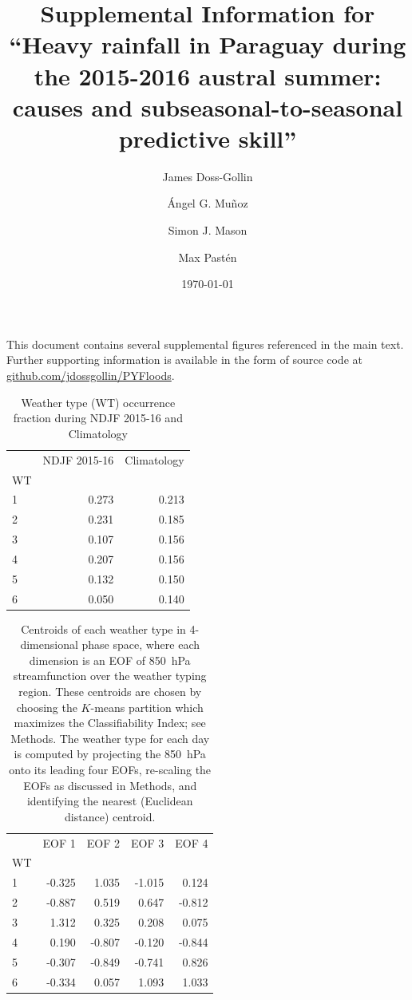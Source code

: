 \documentclass{article}
\title{Supplemental Information for\\``Heavy rainfall in Paraguay during the 2015-2016 austral summer: causes and subseasonal-to-seasonal predictive skill''}
\author{James Doss-Gollin\and \'{A}ngel G. Mu\~{n}oz  \and Simon J. Mason \and Max Past\'{e}n }
\date{\today}
\begin{document}
\maketitle

This document contains several supplemental figures referenced in the main text.
Further supporting information is available in the form of source code at \url{github.com/jdossgollin/PYFloods}.

\listoftables
\listoffigures

\clearpage

\begin{table}
	\centering
	\begin{tabular}{lrr}
		\toprule
		{} &  NDJF 2015-16 &  Climatology \\
		WT &               &              \\
		\midrule
		1     &         0.273 &        0.213 \\
		2     &         0.231 &        0.185 \\
		3     &         0.107 &        0.156 \\
		4     &         0.207 &        0.156 \\
		5     &         0.132 &        0.150 \\
		6     &         0.050 &        0.140 \\
		\bottomrule
	\end{tabular}
	\caption{Weather type (WT) occurrence fraction during NDJF 2015-16 and Climatology}
\end{table}

\begin{table}
	\centering
	\begin{tabular}{lrrrr}
		\toprule
		{} &  EOF 1 &  EOF 2 &  EOF 3 &  EOF 4 \\
		WT &        &        &        &        \\
		\midrule
		1  & -0.325 &  1.035 & -1.015 &  0.124 \\
		2  & -0.887 &  0.519 &  0.647 & -0.812 \\
		3  &  1.312 &  0.325 &  0.208 &  0.075 \\
		4  &  0.190 & -0.807 & -0.120 & -0.844 \\
		5  & -0.307 & -0.849 & -0.741 &  0.826 \\
		6  & -0.334 &  0.057 &  1.093 &  1.033 \\
		\bottomrule
		\end{tabular}
	\caption{
		Centroids of each weather type in 4-dimensional phase space, where each dimension is an EOF of \SI{850}{\hecto\pascal} streamfunction over the weather typing region. 
		These centroids are chosen by choosing the $K$-means partition which maximizes the Classifiability Index; see Methods.
		The weather type for each day is computed by projecting the \SI{850}{\hecto\pascal} onto its leading four EOFs, re-scaling the EOFs as discussed in Methods, and identifying the nearest (Euclidean distance) centroid.
	}
\end{table}
\end{document}
